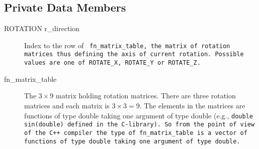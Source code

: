 \subsection{Private Data Members}
    \begin{description}
       \item [ROTATION r\_direction] Index to the row of \tt
       fn\_matrix\_table\rm,  the matrix of rotation matrices 
       thus defining the axis of current rotation. Possible
       values are one of \tt ROTATE\_X\rm, \tt ROTATE\_Y \rm
       or \tt ROTATE\_Z\rm. 
    
       \item [fn\_matrix\_table] The $3 \times 9$ matrix holding rotation 
       matrices.  There are three rotation matrices and each matrix is
       $3 \times 3 = 9$. The elements in the matrices are
       functions of type double taking one argument of type
       double (e.g., \tt double sin(double) \rm defined in the
       C-library). 
       So from the point of view of the C++ compiler
       the type of \tt fn\_matrix\_table \rm is a vector
       of functions of type double taking one argument of type
       double. 

 
                   


    \end{description} 



